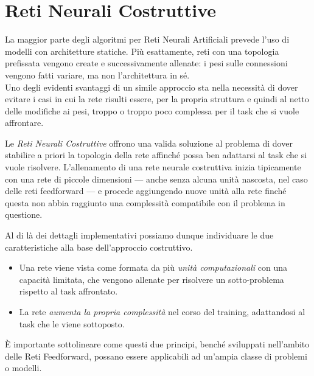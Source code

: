 
\section{Reti Neurali Costruttive}\label{sec:intro:cnn}
La maggior parte degli algoritmi per Reti Neurali Artificiali prevede l'uso di modelli con architetture statiche. Più esattamente, reti con una topologia prefissata vengono create e successivamente allenate: i pesi sulle connessioni vengono fatti variare, ma non l'architettura in sé.\\
Uno degli evidenti svantaggi di un simile approccio sta nella necessità di dover evitare i casi in cui la rete risulti essere, per la propria struttura e quindi al netto delle modifiche ai pesi, troppo o troppo poco complessa per il task che si vuole affrontare.

Le \emph{Reti Neurali Costruttive} \cite{Smieja:NeuralNetworkConstructive,Prechelt:InvestigationOfTheCasCor} offrono una valida soluzione al problema di dover stabilire a priori la topologia della rete affinché possa ben adattarsi al task che si vuole risolvere. L'allenamento di una rete neurale costruttiva inizia tipicamente con una rete di piccole dimensioni --- anche senza alcuna unità nascosta, nel caso delle reti feedforward --- e procede aggiungendo nuove unità alla rete finché questa non abbia raggiunto una complessità compatibile con il problema in questione.

Al di là dei dettagli implementativi possiamo dunque individuare le due caratteristiche alla base dell'approccio costruttivo.
\begin{itemize}
\item Una rete viene vista come formata da più \emph{unità computazionali} con una capacità limitata, che vengono allenate per risolvere un sotto-problema rispetto al task affrontato.
\item La rete \emph{aumenta la propria complessità} nel corso del training, adattandosi al task che le viene sottoposto.
\end{itemize}
\`E importante sottolineare come questi due principi, benché sviluppati nell'ambito delle Reti Feedforward, possano essere applicabili ad un'ampia classe di problemi o modelli.

